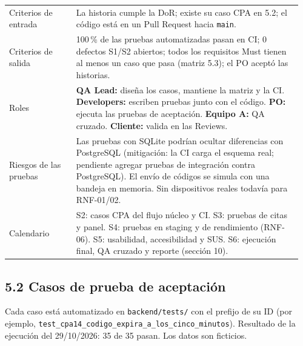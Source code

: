 {\begin{longtable}{@{}L{0.22\linewidth}L{0.74\linewidth}@{}}
Criterios de entrada & La historia cumple la DoR; existe su caso CPA en 5.2; el código está en un Pull
Request hacia \texttt{main}. \\
Criterios de salida & 100\,\% de las pruebas automatizadas pasan en CI; 0 defectos S1/S2 abiertos; todos
los requisitos Must tienen al menos un caso que pasa (matriz 5.3); el PO aceptó las historias. \\
Roles & \textbf{QA Lead:} diseña los casos, mantiene la matriz y la CI. \textbf{Developers:} escriben pruebas
junto con el código. \textbf{PO:} ejecuta las pruebas de aceptación. \textbf{Equipo A:} QA cruzado.
\textbf{Cliente:} valida en las Reviews. \\
Riesgos de las pruebas & Las pruebas con SQLite podrían ocultar diferencias con PostgreSQL (mitigación:
la CI carga el esquema real; pendiente agregar pruebas de integración contra PostgreSQL). El envío de
códigos se simula con una bandeja en memoria. Sin dispositivos reales todavía para RNF-01/02. \\
Calendario & S2: casos CPA del flujo núcleo y CI. S3: pruebas de citas y panel. S4: pruebas en staging y
de rendimiento (RNF-06). S5: usabilidad, accesibilidad y SUS. S6: ejecución final, QA cruzado y reporte
(sección 10). \\
\end{longtable}
}

\subsection{5.2 Casos de prueba de
aceptación}\label{casos-de-prueba-de-aceptaciuxf3n}

Cada caso está automatizado en \texttt{backend/tests/} con el prefijo de su ID (por ejemplo,
\texttt{test\_cpa14\_codigo\_expira\_a\_los\_cinco\_minutos}). Resultado de la ejecución del 29/10/2026:
35 de 35 pasan. Los datos son ficticios.

